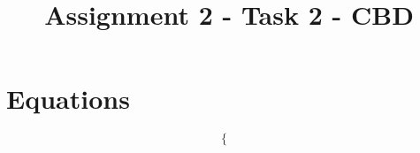 \documentclass[a4paper,12pt]{article}
\begin{document}
\title{Assignment 2 - Task 2 - CBD}\date{}\maketitle
\section{Equations}
\[
\left\{
\begin{array}{c}
\end{array}
\right.
\]
\end{document}
